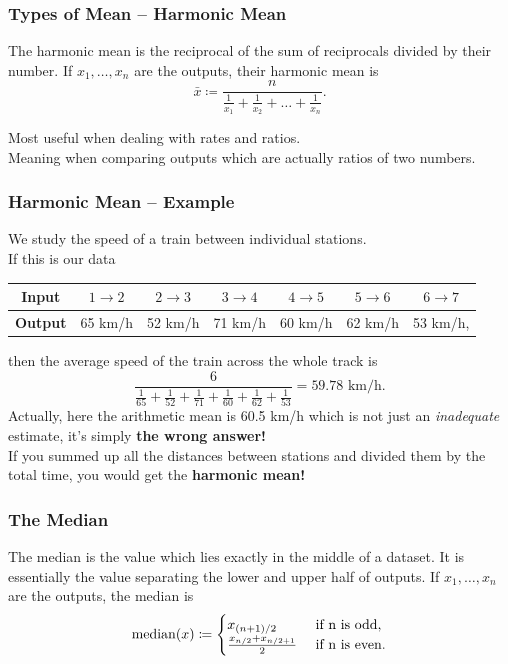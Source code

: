 \documentclass[aspectratio=169,11pt,svgnames]{beamer}
\begin{document}
\begin{frame}
 \frametitle{Types of Mean -- Harmonic Mean}
 \begin{tcolorbox}[title=Harmonic Mean]
  The \alert{harmonic mean} is the reciprocal of the sum of reciprocals divided
  by their number. If $x_1,\ldots,x_n$ are the outputs, their harmonic mean is
  \[
   \bar{x} \coloneqq \frac{n}{\frac{1}{x_1} + \frac{1}{x_2}
   +\ldots+\frac{1}{x_n}}.
  \]
 \end{tcolorbox}
 \pause
 Most useful when dealing with \alert{rates} and \alert{ratios}.\\
 \pause
 Meaning when comparing outputs which are actually ratios of two numbers.
\end{frame}

\begin{frame}
 \frametitle{Harmonic Mean -- Example}
 We study the speed of a train between individual stations.\\
 \pause
 If this is our data
 \begin{center}
  \begin{tabular}{c|cccccc}
   \textbf{Input} & $1 \to 2$ & $2 \to 3$ & $3 \to 4$ & $4 \to 5$ & $5 \to 6$ &
   $6 \to 7$\\
   \midrule
   \textbf{Output} & 65 km/h & 52 km/h & 71 km/h & 60 km/h & 62 km/h & 53 km/h,
  \end{tabular}
 \end{center}
 then the average speed of the train across the whole track is
 \[
  \frac{6}{\frac{1}{65} + \frac{1}{52} + \frac{1}{71} + \frac{1}{60} +
  \frac{1}{62} + \frac{1}{53}} = 59.78 \text{ km/h}.
 \]
 \pause
 Actually, here the arithmetic mean is 60.5 km/h which is not just an
 \emph{inadequate} estimate, it's simply \textbf{the wrong answer!}\\
 \pause
 If you summed up all the distances between stations and divided them by the
 total time, you would get the \textbf{harmonic mean!}
\end{frame}

\begin{frame}
 \frametitle{The Median}
 \begin{tcolorbox}[title=Median]
  The \alert{median} is the value which lies exactly in the middle of a dataset.
  It is essentially the value separating the lower and upper half of outputs. If
  $x_1,\ldots,x_n$ are the outputs, the median is
  \[
   \mathrm{median}(x) \coloneqq 
   \begin{cases}
    x_{(n+1) / 2} & \text{ if } $n$ \text{ is odd},\\
    \frac{x_{n / 2} + x_{n / 2 + 1}}{2} & \text{ if } $n$ \text{ is even}.
   \end{cases}
  \]
 \end{tcolorbox}
\end{frame}
\end{document}
